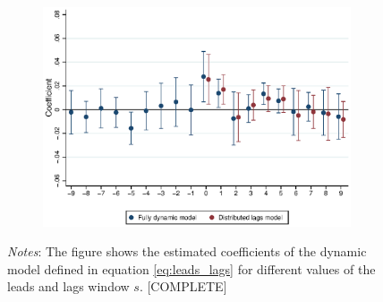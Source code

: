 \begin{figure}[htb!]
\begin{subfigure}[b]{0.5\textwidth}
		\includegraphics[width = .95\textwidth]
		{../../analysis/first_differences/output/fd_models_coeffs_w9.eps}
	\end{subfigure}
	\begin{minipage}{0.95\textwidth} \footnotesize
		\vspace{2mm} 
		\textit{Notes}: The figure shows the estimated coefficients of the dynamic model defined 
		in equation \autoref{eq:leads_lags} for different values of the leads and lags window $s$.
		[COMPLETE]
	\end{minipage}
\end{figure}

